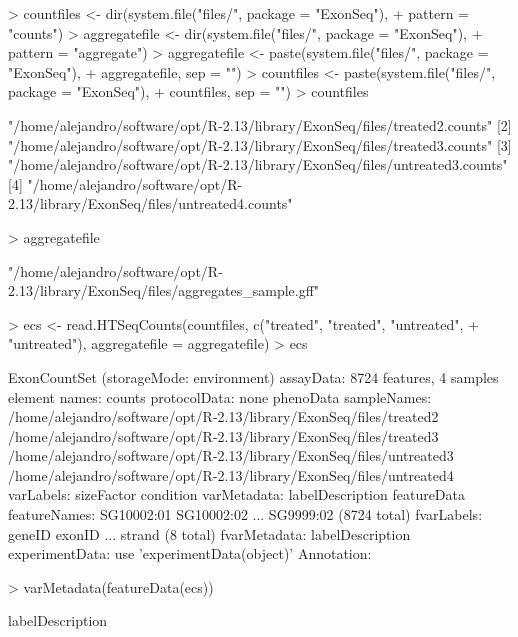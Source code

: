 \documentclass{article}
\begin{document}
\begin{Schunk}
\begin{Sinput}
> countfiles <- dir(system.file("files/", package = "ExonSeq"), 
+     pattern = "counts")
> aggregatefile <- dir(system.file("files/", package = "ExonSeq"), 
+     pattern = "aggregate")
> aggregatefile <- paste(system.file("files/", package = "ExonSeq"), 
+     aggregatefile, sep = "")
> countfiles <- paste(system.file("files/", package = "ExonSeq"), 
+     countfiles, sep = "")
> countfiles
\end{Sinput}
\begin{Soutput}
[1] "/home/alejandro/software/opt/R-2.13/library/ExonSeq/files/treated2.counts"  
[2] "/home/alejandro/software/opt/R-2.13/library/ExonSeq/files/treated3.counts"  
[3] "/home/alejandro/software/opt/R-2.13/library/ExonSeq/files/untreated3.counts"
[4] "/home/alejandro/software/opt/R-2.13/library/ExonSeq/files/untreated4.counts"
\end{Soutput}
\begin{Sinput}
> aggregatefile
\end{Sinput}
\begin{Soutput}
[1] "/home/alejandro/software/opt/R-2.13/library/ExonSeq/files/aggregates_sample.gff"
\end{Soutput}
\begin{Sinput}
> ecs <- read.HTSeqCounts(countfiles, c("treated", "treated", "untreated", 
+     "untreated"), aggregatefile = aggregatefile)
> ecs
\end{Sinput}
\begin{Soutput}
ExonCountSet (storageMode: environment)
assayData: 8724 features, 4 samples 
  element names: counts 
protocolData: none
phenoData
  sampleNames:
    /home/alejandro/software/opt/R-2.13/library/ExonSeq/files/treated2
    /home/alejandro/software/opt/R-2.13/library/ExonSeq/files/treated3
    /home/alejandro/software/opt/R-2.13/library/ExonSeq/files/untreated3
    /home/alejandro/software/opt/R-2.13/library/ExonSeq/files/untreated4
  varLabels: sizeFactor condition
  varMetadata: labelDescription
featureData
  featureNames: SG10002:01 SG10002:02 ... SG9999:02 (8724 total)
  fvarLabels: geneID exonID ... strand (8 total)
  fvarMetadata: labelDescription
experimentData: use 'experimentData(object)'
Annotation:  
\end{Soutput}
\begin{Sinput}
> varMetadata(featureData(ecs))
\end{Sinput}
\begin{Soutput}
                               labelDescription

\end{Soutput}
\end{Schunk}
\end{document}
